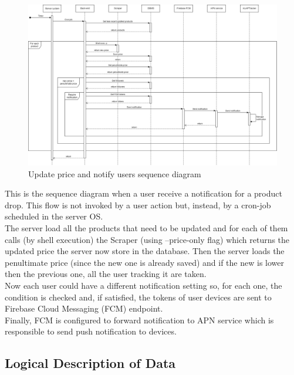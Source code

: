 \begin{figure}[h!]
        \centering
        \includegraphics[scale=0.25]{images/runtime_view/update_notification.png}
        \caption{Update price and notify users sequence diagram}
        \label{fig:update_notification_sequence_diagram}
\end{figure}
\FloatBarrier

This is the sequence diagram when a user receive a notification for a product drop.
This flow is not invoked by a user action but, instead, by a cron-job scheduled in the server OS.\\
The server load all the products that need to be updated and for each of them calls (by shell execution) the Scraper (using --price-only flag) which returns the updated price the server now store in the database.
Then the server loads the penultimate price (since the new one is already saved) and if the new is lower then the previous one, all the user tracking it are taken.\\
Now each user could have a different notification setting so, for each one, the condition is checked and, if satisfied, the tokens of user devices are sent to Firebase Cloud Messaging (FCM) endpoint.\\
Finally, FCM is configured to forward notification to APN service which is responsible to send push notification to devices.

\newpage
\subsection{Logical Description of Data}

